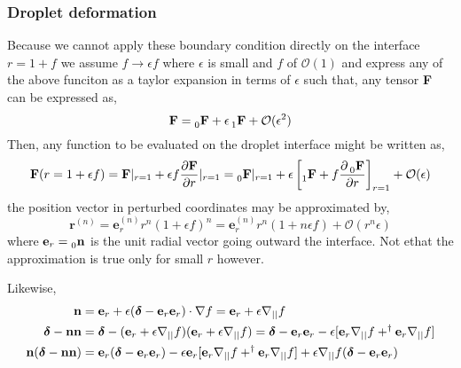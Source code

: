 \subsubsection*{Droplet deformation }

Because we cannot apply these boundary condition directly on the interface $r = 1 + f$ we assume $f \to \epsilon f$ where $\epsilon$ is small and $f$ of $\mathcal{O}(1)$ and express any of the above funciton as a taylor expansion in terms of $\epsilon$ such that, any tensor \textbf{F} can be expressed as, 
\begin{equation}
    \textbf{F}
    = \prescript{}{0}{\textbf{F}}
    + \epsilon \prescript{}{1}{\textbf{F}}
    + \mathcal{O}(\epsilon^2)
\end{equation}
Then, any function to be evaluated on the droplet interface might be written as, 
\begin{equation}
    \textbf{F}(r=1+\epsilon f)
    =
    \textbf{F}|_{r=1}
    + \epsilon f \frac{\partial \textbf{F}}{\partial r}|_{r=1}
    =
    \prescript{}{0}{\textbf{F}}|_{r=1}
    + \epsilon \left[\prescript{}{1}{\textbf{F}}
    + f \frac{\partial\prescript{}{0}{\textbf{F}}}{\partial r}\right]_{r=1}
    + \mathcal{O}(\epsilon)
\end{equation}
the position vector in perturbed coordinates may be approximated by, 
\begin{equation}
    \textbf{r}^{(n)} 
    = \textbf{e}_r^{(n)} r^n (1+\epsilon f)^n
    = \textbf{e}_r^{(n)} r^n (1+ n\epsilon f) + \mathcal{O}(r^n \epsilon)
\end{equation}
where $\textbf{e}_r = \prescript{}{0}{\textbf{n}}$ is the unit radial vector going outward the interface.
Not ethat the approximation is true only for small $r$ however. 

Likewise,
\begin{align}
    \textbf{n} 
    &= \textbf{e}_r + \epsilon (\bm\delta - \textbf{e}_r\textbf{e}_r)\cdot \mathbf{\nabla} f
    = \textbf{e}_r + \epsilon  \mathbf{\nabla}_{||} f\\
    \bm\delta - \textbf{nn} 
    &=
    \bm\delta
    - (\textbf{e}_r + \epsilon \mathbf{\nabla}_{||} f)
    (\textbf{e}_r + \epsilon \mathbf{\nabla}_{||} f)
    =
    \bm\delta
    - \textbf{e}_r\textbf{e}_r
    - \epsilon [
        \textbf{e}_r \mathbf{\nabla}_{||} f
        + ^\dagger \textbf{e}_r \mathbf{\nabla}_{||} f
    ]\\
    \textbf{n}(\bm\delta - \textbf{nn}) 
    &=
    \textbf{e}_r(\bm\delta
    - \textbf{e}_r\textbf{e}_r)
    - \epsilon \textbf{e}_r [
        \textbf{e}_r \mathbf{\nabla}_{||} f
        + ^\dagger \textbf{e}_r \mathbf{\nabla}_{||} f
    ]
    + \epsilon \mathbf{\nabla}_{||} f (\bm\delta
    - \textbf{e}_r\textbf{e}_r)
\end{align}

